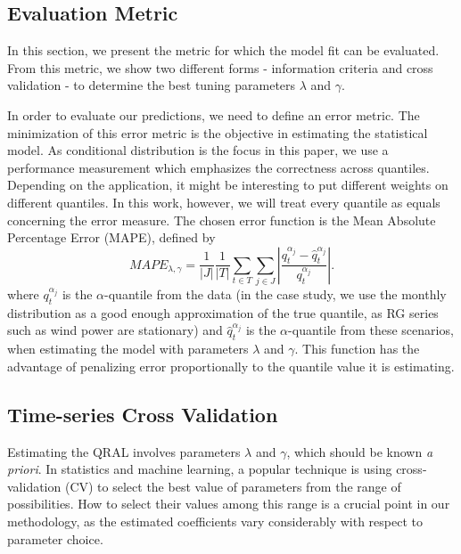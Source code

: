 \subsection{Evaluation Metric}

In this section, we present the metric for which the model fit can be evaluated. From this metric, we show two different forms - information criteria and cross validation - to determine the best tuning parameters $\lambda$ and $\gamma$.

In order to evaluate our predictions, we need to define an error metric. The minimization of this error metric is the objective in estimating the statistical model. 
As conditional distribution is the focus in this paper, we use a performance measurement which emphasizes the correctness across quantiles. Depending on the application, it might be interesting to put different weights on different quantiles. In this work, however, we will treat every quantile as equals concerning the error measure.
The chosen error function is the Mean Absolute Percentage Error (MAPE), defined by
\begin{equation}
MAPE_{\lambda,\gamma}= \frac{1}{|J|} \frac{1}{|T|}  \sum_{t \in T} \sum_{j \in J} \left| \frac{q_t^{\alpha_{j}}- \hat q_t^{\alpha_{j}}}{q_t^{\alpha_{j}}}  \right|. 
\end{equation}
where $q_t^{\alpha_{j}}$ is the $\alpha$-quantile from the data (in the case study, we use the monthly distribution as a good enough approximation of the true quantile, as RG series such as wind power are stationary) and $\hat q_t^{\alpha_j}$ is the $\alpha$-quantile from these scenarios, when estimating the model with parameters $\lambda$ and $\gamma$.
This function has the advantage of penalizing error proportionally to the quantile value it is estimating. 


\subsection{Time-series Cross Validation} \label{sec:cv}

Estimating the QRAL involves parameters $\lambda$ and $\gamma$, which should be known \textit{a priori}. In statistics and machine learning, a popular technique is using cross-validation (CV) to select the best value of parameters from the range of possibilities. How to select their values among this range is a crucial point in our methodology, as the estimated coefficients vary considerably with respect to parameter choice.

